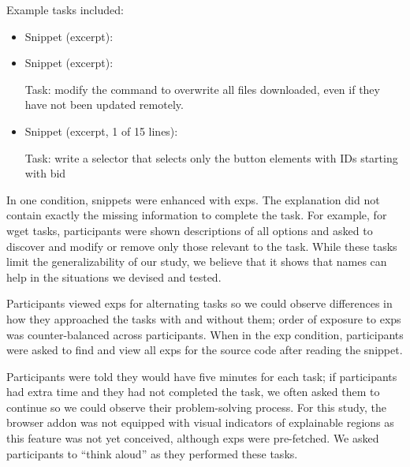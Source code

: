 Example tasks included:
\begin{itemize}

\item
Snippet (excerpt):

\item
Snippet (excerpt):


Task: modify the command to overwrite all files downloaded, even if they have not been updated remotely.

\item

Snippet (excerpt, 1 of 15 lines):


Task: write a selector that selects only the button elements with IDs starting with bid

\end{itemize}
\fi
%
\begin{changes}
In one condition, snippets were enhanced with \glspl{exp}.
The explanation did not contain exactly the missing information to complete the task.
For example, for wget tasks, participants were shown descriptions of all options and asked to discover and modify or remove only those relevant to the task.
While these tasks limit the generalizability of our study, we believe that it shows that \Glspl{name} can help in the situations we devised and tested.

Participants viewed \glspl{exp} for alternating tasks so we could observe differences in how they approached the tasks with and without them; order of exposure to \glspl{exp} was counter-balanced across participants. 
When in the \gls{exp} condition, participants were asked to find and view all \glspl{exp} for the source code after reading the snippet.

Participants were told they would have five minutes for each task; if participants had extra time and they had not completed the task, we often asked them to continue so we could observe their problem-solving process.
For this study, the browser addon was not equipped with visual indicators of explainable regions as this feature was not yet conceived, although \glspl{exp} were pre-fetched.
We asked participants to ``think aloud'' as they performed these tasks.

\end{changes}

